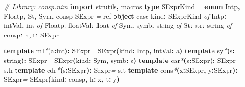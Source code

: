 \documentclass[
  12pt,
]{book}
\newenvironment{Shaded}{}{}
\newcommand{\CommentTok}[1]{\textcolor[rgb]{0.38,0.63,0.69}{\textit{#1}}}
\newcommand{\DataTypeTok}[1]{\textcolor[rgb]{0.56,0.13,0.00}{#1}}
\newcommand{\KeywordTok}[1]{\textcolor[rgb]{0.00,0.44,0.13}{\textbf{#1}}}
\newcommand{\NormalTok}[1]{#1}
\newcommand{\StringTok}[1]{\textcolor[rgb]{0.25,0.44,0.63}{#1}}
\begin{document}
\begin{Shaded}
\begin{Highlighting}[]
\CommentTok{\# Library: consp.nim}
\KeywordTok{import}\NormalTok{ strutils}\KeywordTok{,}\NormalTok{ macros}
\KeywordTok{type}
  \DataTypeTok{SExprKind} \CommentTok{=} \KeywordTok{enum }\DataTypeTok{Intp}\KeywordTok{,} \DataTypeTok{Floatp}\KeywordTok{,} \DataTypeTok{St}\KeywordTok{,} \DataTypeTok{Sym}\KeywordTok{,}\NormalTok{ consp}
  \DataTypeTok{SExpr} \CommentTok{=} \DataTypeTok{ref} \KeywordTok{object}
       \DataTypeTok{case}\NormalTok{ kind}\KeywordTok{:} \DataTypeTok{SExprKind}
       \CommentTok{of} \DataTypeTok{Intp}\KeywordTok{:}\NormalTok{ intVal}\KeywordTok{:} \DataTypeTok{int}
       \CommentTok{of} \DataTypeTok{Floatp}\KeywordTok{:}\NormalTok{ floatVal}\KeywordTok{:} \DataTypeTok{float}
       \CommentTok{of} \DataTypeTok{Sym}\KeywordTok{:}\NormalTok{ symb}\KeywordTok{:} \DataTypeTok{string}
       \CommentTok{of} \DataTypeTok{St}\KeywordTok{:}\NormalTok{ str}\KeywordTok{:} \DataTypeTok{string}
       \CommentTok{of}\NormalTok{ consp}\KeywordTok{:}\NormalTok{ h}\KeywordTok{,}\NormalTok{ t}\KeywordTok{:} \DataTypeTok{SExpr}

\KeywordTok{template }\StringTok{mI}\CommentTok{*}\KeywordTok{(}\NormalTok{a}\KeywordTok{:}\DataTypeTok{int}\KeywordTok{):} \DataTypeTok{SExpr}\CommentTok{=} \DataTypeTok{SExpr}\KeywordTok{(}\NormalTok{kind}\KeywordTok{:} \DataTypeTok{Intp}\KeywordTok{,}\NormalTok{ intVal}\KeywordTok{:}\NormalTok{ a}\KeywordTok{)}
\KeywordTok{template }\StringTok{sy}\CommentTok{*}\KeywordTok{(}\NormalTok{s}\KeywordTok{:} \DataTypeTok{string}\KeywordTok{):} \DataTypeTok{SExpr}\CommentTok{=} \DataTypeTok{SExpr}\KeywordTok{(}\NormalTok{kind}\KeywordTok{:} \DataTypeTok{Sym}\KeywordTok{,}\NormalTok{ symb}\KeywordTok{:}\NormalTok{ \textasciigrave{}s\textasciigrave{}}\KeywordTok{)}
\KeywordTok{template }\StringTok{car}\CommentTok{*}\KeywordTok{(}\NormalTok{s}\KeywordTok{:}\DataTypeTok{SExpr}\KeywordTok{):} \DataTypeTok{SExpr}\CommentTok{=}\NormalTok{ s}\KeywordTok{.}\DataTypeTok{h}
\KeywordTok{template }\StringTok{cdr}\CommentTok{*}\KeywordTok{(}\NormalTok{s}\KeywordTok{:}\DataTypeTok{SExpr}\KeywordTok{):} \DataTypeTok{Sexpr}\CommentTok{=}\NormalTok{ s}\KeywordTok{.}\DataTypeTok{t}
\KeywordTok{template }\StringTok{cons}\CommentTok{*}\KeywordTok{(}\NormalTok{x}\KeywordTok{:}\DataTypeTok{SExpr}\KeywordTok{,}\NormalTok{ y}\KeywordTok{:}\DataTypeTok{SExpr}\KeywordTok{):} \DataTypeTok{SExpr}\CommentTok{=} \DataTypeTok{SExpr}\KeywordTok{(}\NormalTok{kind}\KeywordTok{:}\NormalTok{ consp}\KeywordTok{,}\NormalTok{ h}\KeywordTok{:}\NormalTok{ x}\KeywordTok{,}\NormalTok{ t}\KeywordTok{:}\NormalTok{ y}\KeywordTok{)}


\end{Highlighting}
\end{Shaded}
\end{document}
